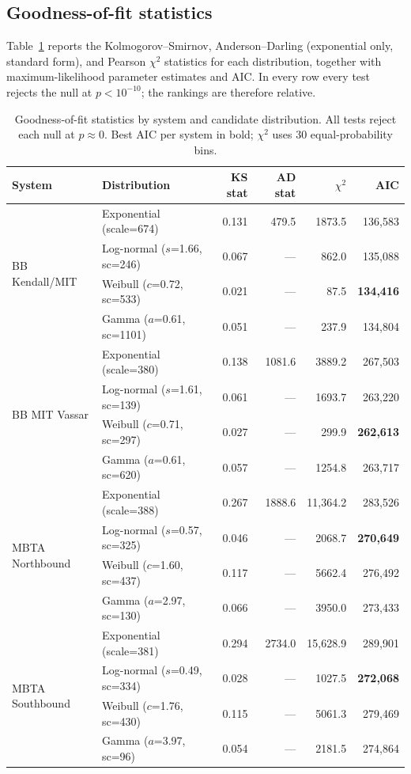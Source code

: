 \subsection{Goodness-of-fit statistics}\label{app:gof}

Table~\ref{tab:gof} reports the Kolmogorov--Smirnov, Anderson--Darling (exponential only, standard form), and Pearson $\chi^2$ statistics for each distribution, together with maximum-likelihood parameter estimates and AIC. In every row every test rejects the null at $p < 10^{-10}$; the rankings are therefore relative.

\begin{table}[h]
\centering
\caption{Goodness-of-fit statistics by system and candidate distribution. All tests reject each null at $p \approx 0$. Best AIC per system in bold; $\chi^2$ uses 30 equal-probability bins.}
\label{tab:gof}
\footnotesize
\setlength{\tabcolsep}{4pt}
\begin{tabular}{@{}llrrrr@{}}
\toprule
System & Distribution & KS stat & AD stat & $\chi^2$ & AIC \\
\midrule
\multirow{4}{*}{BB Kendall/MIT}
  & Exponential (scale=674) & 0.131 & 479.5 & 1873.5 & 136{,}583 \\
  & Log-normal ($s$=1.66, sc=246) & 0.067 & --- & 862.0 & 135{,}088 \\
  & Weibull ($c$=0.72, sc=533) & 0.021 & --- & 87.5 & \textbf{134{,}416} \\
  & Gamma ($a$=0.61, sc=1101) & 0.051 & --- & 237.9 & 134{,}804 \\
\midrule
\multirow{4}{*}{BB MIT Vassar}
  & Exponential (scale=380) & 0.138 & 1081.6 & 3889.2 & 267{,}503 \\
  & Log-normal ($s$=1.61, sc=139) & 0.061 & --- & 1693.7 & 263{,}220 \\
  & Weibull ($c$=0.71, sc=297) & 0.027 & --- & 299.9 & \textbf{262{,}613} \\
  & Gamma ($a$=0.61, sc=620) & 0.057 & --- & 1254.8 & 263{,}717 \\
\midrule
\multirow{4}{*}{MBTA Northbound}
  & Exponential (scale=388) & 0.267 & 1888.6 & 11{,}364.2 & 283{,}526 \\
  & Log-normal ($s$=0.57, sc=325) & 0.046 & --- & 2068.7 & \textbf{270{,}649} \\
  & Weibull ($c$=1.60, sc=437) & 0.117 & --- & 5662.4 & 276{,}492 \\
  & Gamma ($a$=2.97, sc=130) & 0.066 & --- & 3950.0 & 273{,}433 \\
\midrule
\multirow{4}{*}{MBTA Southbound}
  & Exponential (scale=381) & 0.294 & 2734.0 & 15{,}628.9 & 289{,}901 \\
  & Log-normal ($s$=0.49, sc=334) & 0.028 & --- & 1027.5 & \textbf{272{,}068} \\
  & Weibull ($c$=1.76, sc=430) & 0.115 & --- & 5061.3 & 279{,}469 \\
  & Gamma ($a$=3.97, sc=96) & 0.054 & --- & 2181.5 & 274{,}864 \\
\bottomrule
\end{tabular}
\end{table}

